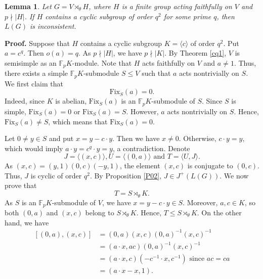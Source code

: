 \documentclass[12pt]{article}
\newtheorem{lemma}{\bf Lemma}[section]
\def\proof{{\bf Proof.} }
\begin{document}
\begin{lemma}\label{RE++1}
Let $G=V\rtimes_{\theta}H$, where $H$ is a finite group acting faithfully on $V$ and $p\nmid |H|$. If $H$ contains 
a cyclic subgroup of order $q^2$ for some prime $q$, then $L(G)$ is inconsistent.
\end{lemma}
\proof
Suppose that $H$ contains a cyclic subgroup $K=\langle c \rangle$ of order $q^2$. Put $a=c^q$. Then $o(a)=q$. 
As $p\nmid |H|$, we have $p\nmid |K|$. By Theorem \ref{cq1}, $V$ is semisimple as an $\mathbb{F}_pK$-module. 
Note that $H$ acts faithfully on $V$ and $a\neq 1$. Thus, there exists a simple $\mathbb{F}_pK$-submodule $S\leq V$ 
such that $a$ acts nontrivially on $S$. We first claim that $$\mbox{Fix}_S(a)=0.$$ Indeed, since $K$ is abelian, $\mbox{Fix}_S(a)$ is an 
$\mathbb{F}_pK$-submodule of $S$. Since $S$ is simple, $\mbox{Fix}_S(a)=0$ or $\mbox{Fix}_S(a)=S$. 
However, $a$ acts nontrivially on $S$. Hence, $\mbox{Fix}_S(a)\neq S$, which means that $\mbox{Fix}_S(a)=0$.

Let $0\neq y\in S$ and put $x=y-c\cdot y$. Then we have $x\neq 0$. Otherwise, $c\cdot y=y$, 
which would imply $a\cdot y=c^q \cdot y=y$, a contradiction. Denote $$J=\langle (x, c)\rangle, U=\langle (0, a)\rangle \mbox{ and }T=\langle U, J\rangle.$$
As $(x, c)=(y, 1)(0, c)(-y,1)$, the element $(x,c)$ is conjugate to $(0,c)$. Thus, $J$ is cyclic of order $q^2$. By Proposition \ref{P02}, $J\in J^{+}(L(G))$. 
We now prove that $$T=S\rtimes_{\theta} K.$$
As $S$ is an $\mathbb{F}_pK$-submodule of $V$, we have $x=y-c\cdot y\in S$. Moreover, $a, c\in K$, so both $(0,a)$ and $(x,c)$ belong to $S\rtimes_{\theta} K$. 
Hence, $T\leq S\rtimes_{\theta} K$. On the other hand, we have 
$$\begin{aligned}
[(0,a),(x,c)]
&=(0,a)(x,c)(0,a)^{-1}(x,c)^{-1}\\
&=(a\cdot x,ac)(0,a)^{-1}(x,c)^{-1}\\
&=(a\cdot x,c)(-c^{-1}\cdot x,c^{-1}) \mbox{ since } ac=ca\\
&=(a\cdot x-x,1).
\end{aligned}$$
\end{document}
